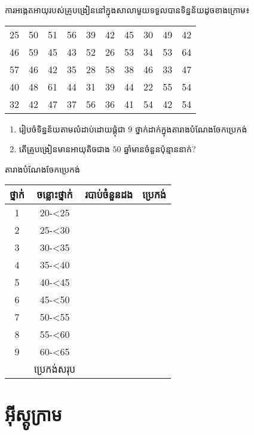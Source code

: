 \documentclass[a4paper,12pt,blue]{pptec}
\begin{document}
	\begin{example}
		ការអង្កេតអាយុរបស់គ្រូបង្រៀននៅក្នុងសាលាមួយទទួលបានទិន្នន័យដូចខាងក្រោម៖
		\begin{table}[H]
			\centering
			\begin{tabular}{cccccccccc}
				25 & 50 & 51 & 56 & 39 & 42 & 45 & 30 & 49 & 42\\
				46 & 59 & 45 & 43 & 52 & 26 & 53 & 34 & 53 & 64\\
				57 & 46 & 42 & 35 & 28 & 58 & 38 & 46 & 33 & 47\\
				40 & 48 & 61 & 44 & 31 & 39 & 44 & 22 & 55 & 54\\
				32 & 42 & 47 & 37 & 56 & 36 & 41 & 54 & 42 & 54
			\end{tabular}
		\end{table}
		\begin{enumerate}[k]
			\item រៀបចំទិន្នន័យតាមលំដាប់ដោយផ្គុំជា $ 9 $ ថ្នាក់ដាក់ក្នុងតារាងបំណែងចែកប្រេកង់
			\item តើគ្រូបង្រៀនមានអាយុតិចជាង $ 50 $ ឆ្នាំមានចំនួនប៉ុន្មាននាក់?
		\end{enumerate}
	\end{example}
	\begin{answer}
		តារាងបំណែងចែកប្រេកង់
		\begin{table}[H]
			\centering
			\begin{tabular}{|c|c|c|c|}
				\hline
				ថ្នាក់ & ចន្លោះថ្នាក់ & របាប់ចំនួនដង & ប្រេកង់\\
				\hline
				1 & 20-<25 & &\\
				\hline
				2 & 25-<30 & &\\
				\hline
				3 & 30-<35 & &\\
				\hline
				4 & 35-<40 & &\\
				\hline
				5 & 40-<45 & &\\
				\hline
				6 & 45-<50 & &\\
				\hline
				7 & 50-<55 & &\\
				\hline
				8 & 55-<60 & &\\
				\hline
				9 & 60-<65 & &\\
				\hline
				& ប្រេកង់សរុប & & \\
				\hline
			\end{tabular}
		\end{table}
	\end{answer}
	\section{អ៊ីស្តូក្រាម}
\end{document}
